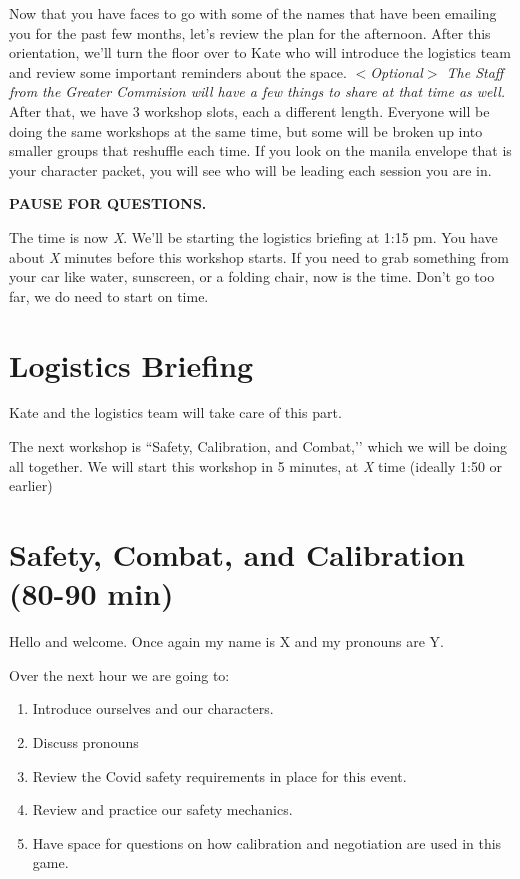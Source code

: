 \documentclass[green]{GL2020}
\begin{document}
Now that you have faces to go with some of the names that have been emailing you for the past few months, let’s review the plan for the afternoon. After this orientation, we’ll turn the floor over to Kate who will introduce the logistics team and review some important reminders about the space. \emph{$<$Optional$>$ The Staff from the Greater Commision will have a few things to share at that time as well.} After that, we have 3 workshop slots, each a different length. Everyone will be doing the same workshops at the same time, but some will be broken up into smaller groups that reshuffle each time. If you look on the manila envelope that is your character packet, you will see who will be leading each session you are in. 

\textbf{PAUSE FOR QUESTIONS.}

The time is now \emph{X}. We'll be starting the logistics briefing at 1:15 pm. You have about \emph{X} minutes before this workshop starts. If you need to grab something from your car like water, sunscreen, or a folding chair, now is the time. Don't go too far, we do need to start on time.

\section*{Logistics Briefing}
Kate and the logistics team will take care of this part. 

The next workshop is ``Safety, Calibration, and Combat,’’ which we will be doing all together. We will start this workshop in 5 minutes, at \emph{X} time (ideally 1:50 or earlier)

\section*{Safety, Combat, and Calibration (80-90 min)}
Hello and welcome. Once again my name is X and my pronouns are Y.

Over the next hour we are going to:
\begin{enumerate}
	\item Introduce ourselves and our characters.
	\item Discuss pronouns
	\item Review the Covid safety requirements in place for this event.
	\item Review and practice our safety mechanics.
	\item Have space for questions on how calibration and negotiation are used in this game.
\end{enumerate}
\end{document}

